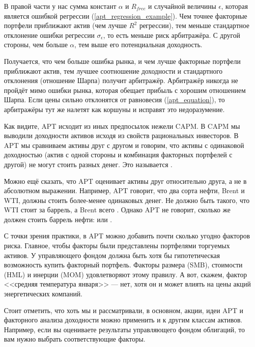 В правой части у нас сумма констант $\alpha$ и $R_{free}$ и случайной величины
$\epsilon$, которая является ошибкой регрессии (\ref{apt_regression_example}). 
Чем точнее факторные портфели приближают актив (чем лучше $R^2$ регрессии), тем 
меньше стандартное отклонение ошибки регрессии $\sigma_{\epsilon}$, то есть 
меньше риск арбитражёра. С другой стороны, чем больше $\alpha$, тем выше его 
потенциальная доходность.

Получается, что чем больше ошибка рынка, и чем лучше факторные портфели 
приближают актив, тем лучшее соотношение доходности и стандартного отклонения 
(отношение Шарпа) получит арбитражёр. Арбитражёр никогда не пройдёт мимо ошибки 
рынка, которая обещает прибыль с хорошим отношением Шарпа. Если цены сильно 
отклонятся от равновесия (\ref{apt_equation}), то арбитражёры тут же налетят как 
коршуны и исправят это недоразумение.

Как видите, APT исходит из иных предпосылок нежели CAPM. В CAPM мы выводили 
доходности активов исходя из свойств рациональных инвесторов. В APT мы 
сравниваем активы друг с другом и говорим, что активы с одинаковой доходностью 
(актив с одной стороны и комбинация факторных портфелей с другой) не могут 
стоить разных денег. Это называется . 

Можно ещё сказать, что APT оценивает активы друг относительно друга, а не в 
абсолютном выражении. Например, APT говорит, что два сорта нефти, Brent и WTI, 
должны стоить более-менее одинаковых денег. Не должно быть такого, что WTI стоит 
 за баррель, а Brent всего . Однако APT не говорит, 
сколько же должен стоить баррель нефти:  или .

С точки зрения практики, в APT можно добавить почти сколько угодно факторов 
риска. Главное, чтобы факторы были представлены портфелями торгуемых активов. У 
управляющего фондом должна быть хотя бы гипотетическая возможность купить 
факторный портфель. Факторы размера (SMB), стоимости (HML) и инерции (MOM) 
удовлетворяют этому правилу. А вот, скажем, фактор <<средняя температура 
января>> --- нет, хотя он и может влиять на цены акций энергетических компаний.

Стоит отметить, что хоть мы и рассматривали, в основном, акции, идеи APT и 
факторного анализа доходности можно применить и к другим классам активов. 
Например, если вы оцениваете результаты управляющего фондом облигаций, то вам 
нужно выбрать соответствующие факторы.

